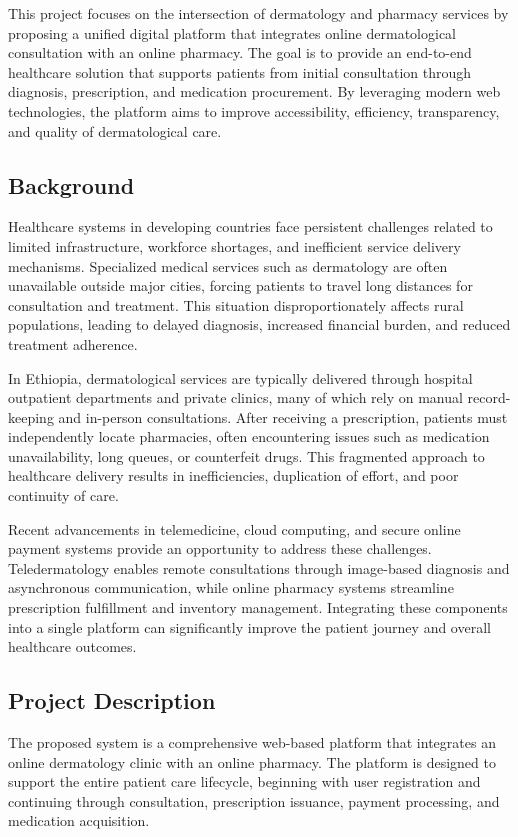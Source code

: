 \documentclass[12pt,a4paper]{report}
\begin{document}
This project focuses on the intersection of dermatology and pharmacy services by proposing a unified digital platform that integrates online dermatological consultation with an online pharmacy. The goal is to provide an end-to-end healthcare solution that supports patients from initial consultation through diagnosis, prescription, and medication procurement. By leveraging modern web technologies, the platform aims to improve accessibility, efficiency, transparency, and quality of dermatological care.



\subsection{Background}
Healthcare systems in developing countries face persistent challenges related to limited infrastructure, workforce shortages, and inefficient service delivery mechanisms. Specialized medical services such as dermatology are often unavailable outside major cities, forcing patients to travel long distances for consultation and treatment. This situation disproportionately affects rural populations, leading to delayed diagnosis, increased financial burden, and reduced treatment adherence.

In Ethiopia, dermatological services are typically delivered through hospital outpatient departments and private clinics, many of which rely on manual record-keeping and in-person consultations. After receiving a prescription, patients must independently locate pharmacies, often encountering issues such as medication unavailability, long queues, or counterfeit drugs. This fragmented approach to healthcare delivery results in inefficiencies, duplication of effort, and poor continuity of care.

Recent advancements in telemedicine, cloud computing, and secure online payment systems provide an opportunity to address these challenges. Teledermatology enables remote consultations through image-based diagnosis and asynchronous communication, while online pharmacy systems streamline prescription fulfillment and inventory management. Integrating these components into a single platform can significantly improve the patient journey and overall healthcare outcomes.



\subsection{Project Description}
The proposed system is a comprehensive web-based platform that integrates an online dermatology clinic with an online pharmacy. The platform is designed to support the entire patient care lifecycle, beginning with user registration and continuing through consultation, prescription issuance, payment processing, and medication acquisition.
\end{document}
